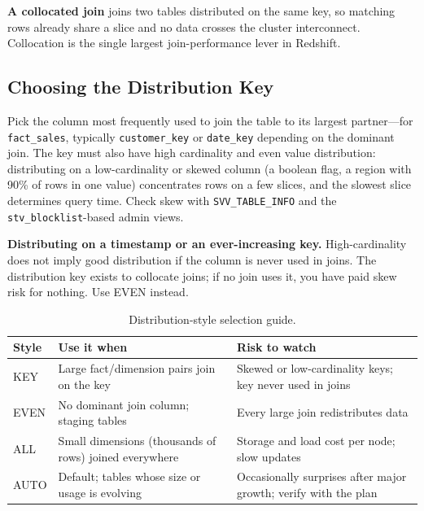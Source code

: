 \begin{definitionbox}
\textbf{A collocated join} joins two tables distributed on the same key, so matching rows already share a slice and no data crosses the cluster interconnect. Collocation is the single largest join-performance lever in Redshift.
\end{definitionbox}

\subsection{Choosing the Distribution Key}
Pick the column most frequently used to join the table to its largest partner---for \texttt{fact\_sales}, typically \texttt{customer\_key} or \texttt{date\_key} depending on the dominant join. The key must also have high cardinality and even value distribution: distributing on a low-cardinality or skewed column (a boolean flag, a region with 90\% of rows in one value) concentrates rows on a few slices, and the slowest slice determines query time. Check skew with \texttt{SVV\_TABLE\_INFO} and the \texttt{stv\_blocklist}-based admin views.

\begin{pitfall}
\textbf{Distributing on a timestamp or an ever-increasing key.} High-cardinality does not imply good distribution if the column is never used in joins. The distribution key exists to collocate joins; if no join uses it, you have paid skew risk for nothing. Use EVEN instead.
\end{pitfall}

\begin{table}[H]
\centering
\small
\begin{tabular}{@{}p{2.4cm}p{4.6cm}p{5.4cm}@{}}
\toprule
\textbf{Style} & \textbf{Use it when} & \textbf{Risk to watch} \\
\midrule
KEY & Large fact/dimension pairs join on the key & Skewed or low-cardinality keys; key never used in joins \\
EVEN & No dominant join column; staging tables & Every large join redistributes data \\
ALL & Small dimensions (thousands of rows) joined everywhere & Storage and load cost per node; slow updates \\
AUTO & Default; tables whose size or usage is evolving & Occasionally surprises after major growth; verify with the plan \\
\bottomrule
\end{tabular}
\caption{Distribution-style selection guide.}
\label{tab:ch6-dist-styles}
\end{table}

